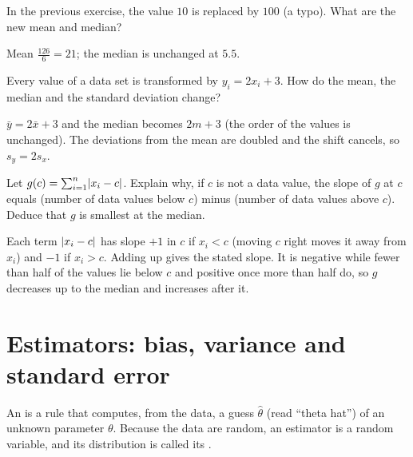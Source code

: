 \begin{exercise}
In the previous exercise, the value $10$ is replaced by $100$ (a typo). What are
the new mean and median?
\end{exercise}
\begin{solution}
Mean $\tfrac{126}{6} = 21$; the median is unchanged at $5.5$.
\end{solution}

\begin{exercise}
Every value of a data set is transformed by $y_i = 2x_i + 3$. How do the mean,
the median and the standard deviation change?
\end{exercise}
\begin{solution}
$\bar y = 2\bar x + 3$ and the median becomes $2m + 3$ (the order of the values is
unchanged). The deviations from the mean are doubled and the shift cancels, so
$s_y = 2s_x$.
\end{solution}

\begin{exercise}
Let $g(c) = \sum_{i=1}^n\lvert x_i - c\rvert$. Explain why, if $c$ is not a data value,
the slope of $g$ at $c$ equals (number of data values below $c$) minus (number
of data values above $c$). Deduce that $g$ is smallest at the median.
\end{exercise}
\begin{solution}
Each term $\lvert x_i - c\rvert$ has slope $+1$ in $c$ if $x_i < c$ (moving $c$ right
moves it away from $x_i$) and $-1$ if $x_i > c$. Adding up gives the stated
slope. It is negative while fewer than half of the values lie below $c$ and
positive once more than half do, so $g$ decreases up to the median and increases
after it.
\end{solution}

\section{Estimators: bias, variance and standard error}\label{sec:estimators}

\begin{definition}[Estimator]\label{def:estimator}
An  is a rule that computes, from the data, a guess $\hat\theta$
(read ``theta hat'') of an unknown parameter $\theta$. Because the data are
random, an estimator is a random variable, and its distribution is called its
.
\end{definition}

